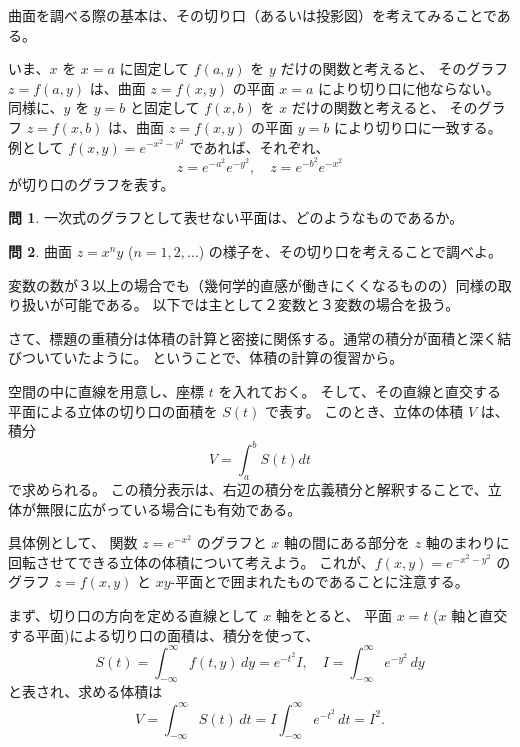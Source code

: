 \documentclass[a4paper]{jsarticle}
\theoremstyle{definition}
\newtheorem{Exercise}{問}%
\theoremstyle{remark}
\begin{document}
曲面を調べる際の基本は、その切り口（あるいは投影図）を考えてみることである。

いま、$x$ を $x=a$ に固定して $f(a,y)$ を $y$ だけの関数と考えると、
そのグラフ $z = f(a,y)$ は、曲面 $z=f(x,y)$ の平面 $x=a$ により切り口に他ならない。
同様に、$y$ を $y=b$ と固定して $f(x,b)$ を $x$ だけの関数と考えると、
そのグラフ $z = f(x,b)$ は、曲面 $z=f(x,y)$ の平面 $y=b$ により切り口に一致する。
例として $f(x,y) = e^{-x^2-y^2}$ であれば、それぞれ、
\[
z = e^{-a^2} e^{-y^2}, 
\quad 
z = e^{-b^2} e^{-x^2}
\]
が切り口のグラフを表す。

\begin{Exercise}
一次式のグラフとして表せない平面は、どのようなものであるか。
\end{Exercise}

\begin{Exercise}
曲面 $z = x^ny$ ($n=1,2,\dots$) の様子を、その切り口を考えることで調べよ。
\end{Exercise}


変数の数が３以上の場合でも（幾何学的直感が働きにくくなるものの）同様の取り扱いが可能である。
以下では主として２変数と３変数の場合を扱う。


さて、標題の重積分は体積の計算と密接に関係する。通常の積分が面積と深く結びついていたように。
ということで、体積の計算の復習から。

空間の中に直線を用意し、座標 $t$ を入れておく。
そして、その直線と直交する平面による立体の切り口の面積を $S(t)$ で表す。
このとき、立体の体積 $V$ は、積分
\[
V = \int_a^b S(t) dt
\]
で求められる。%
この積分表示は、右辺の積分を広義積分と解釈することで、立体が無限に広がっている場合にも有効である。

具体例として、
関数 $z = e^{-x^2}$ のグラフと $x$ 軸の間にある部分を $z$ 軸のまわりに
回転させてできる立体の体積について考えよう。
これが、$f(x,y) = e^{-x^2-y^2}$ のグラフ $z = f(x,y)$ と $xy$-平面とで囲まれたものであることに注意する。

まず、切り口の方向を定める直線として $x$ 軸をとると、
平面 $x=t$ ($x$ 軸と直交する平面)による切り口の面積は、積分を使って、
\[
S(t) = \int_{-\infty}^\infty f(t,y)\, dy 
= e^{-t^2} I, 
\quad 
I = \int_{-\infty}^\infty e^{-y^2}\, dy
\]
と表され、求める体積は
\[
V = \int_{-\infty}^\infty S(t)\, dt = I \int_{-\infty} ^\infty e^{-t^2}\, dt 
= I^2. 
\]
\end{document}
